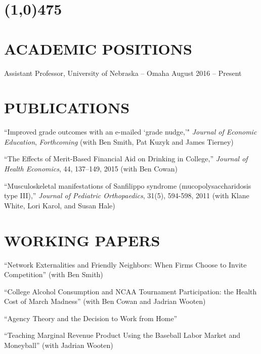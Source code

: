 \documentclass[margin]{res}  %
\begin{document}
\begin{resume} 
\section{\line(1,0){475}} %

\section{\textnormal{ACADEMIC POSITIONS}} 
Assistant Professor, University of Nebraska -- Omaha \hfill August 2016  -- Present\\

\section{\textnormal{PUBLICATIONS}}

``Improved grade outcomes with an e-mailed ‘grade nudge,’" {\it Journal of Economic Education}, \emph{Forthcoming} (with Ben Smith, Pat Kuzyk and James Tierney)

``The Effects of Merit-Based Financial Aid on Drinking in College,'' {\it Journal of Health Economics}, 44, 137–149, 2015 (with Ben Cowan)

``Musculoskeletal manifestations of Sanfilippo syndrome (mucopolysaccharidosis type III),'' {\it Journal of Pediatric Orthopaedics}, 31(5), 594-598, 2011 (with Klane White, Lori Karol, and Susan Hale)
 


\section{\textnormal{WORKING PAPERS}}
``Network Externalities and Friendly Neighbors: When Firms Choose to Invite Competition'' (with Ben Smith)

``College Alcohol Consumption and NCAA Tournament Participation: the Health Cost of March Madness'' (with Ben Cowan and Jadrian Wooten)

``Agency Theory and the Decision to Work from Home''

``Teaching Marginal Revenue Product Using the Baseball Labor Market and Moneyball'' (with Jadrian Wooten)


\end{resume}
\end{document}
